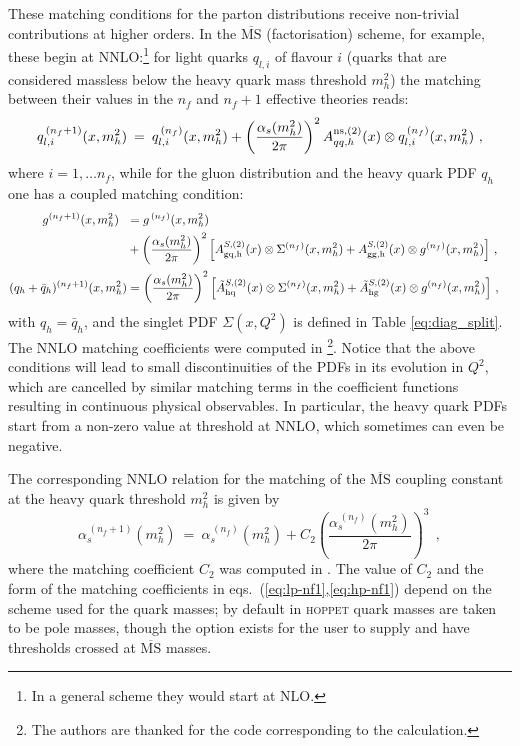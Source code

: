 \documentclass[12pt]{article}
\newcommand{\lp}{\left(}
\newcommand{\rp}{\right)}
\newcommand{\nf}{n_f)}
\newcommand{\nn}{\nonumber}
\newcommand{\as}{\alpha_s}
\newcommand{\MSbar}{\overline{\mathrm{MS}}}
\newcommand{\hoppet}{\textsc{hoppet}\xspace}
\begin{document}
These matching conditions for the parton distributions
receive non-trivial contributions at higher orders. In the $\MSbar$
(factorisation) scheme, for example, these begin at NNLO:\footnote{In
  a general scheme they would start at NLO.} %
for light quarks $q_{l,i}$ of flavour $i$ 
(quarks that are considered massless
below the heavy quark mass threshold $m_h^2$) the matching between
their values in the $n_f$ and
$n_f+1$ effective theories reads:
\begin{equation}
\label{eq:lp-nf1}
  q_{l,i}^{\,(n_f+1)}(x,m_h^2) \: = \:  q_{l,i}^{\,(\nf}(x,m_h^2) +
\lp \frac{\alpha_s(m_h^2)}{2\pi} \rp^2
   A^{\rm ns,(2)}_{qq,h}(x) \otimes
  q_{l,i}^{\, (\nf}(x,m_h^2) \ ,
\end{equation}
where  $i = 1,\ldots n_f$, while for the gluon
distribution and the heavy quark PDF $q_h$ one has a coupled matching 
condition:
\begin{align}
\label{eq:hp-nf1}
  g^{(n_f+1)}(x,m_h^2) \:\:\: &=
    g^{\, (\nf}(x,m_h^2) 
\\ &+ \lp \frac{\alpha_s(m_h^2)}{2\pi} \rp^2 \Big[
    A_{\rm gq,h}^{S,(2)}(x) \otimes \Sigma^{(\nf}(x,m_h^2) +
    A_{\rm gg,h}^{S,(2)}(x) \otimes g^{(\nf}(x,m_h^2) \Big ]\ ,
  \nn \\[0.5mm] 
  (q_h+\bar{q}_{h})^{(n_f+1)}(x,m_h^2)  &=
   \lp \frac{\alpha_s(m_h^2)}{2\pi} \rp^2 \Big [
    \tilde{A}_{\rm hq}^{S,(2)}(x)\otimes \Sigma^{(\nf}(x,m_h^2) 
    + \tilde{A}_{\rm hg}^{S,(2)}(x)\otimes g^{(\nf}(x,m_h^2) \Big  ] \ ,
  \quad \nonumber
\end{align}
with $q_h=\bar{q}_h$, and the singlet PDF $\Sigma(x,Q^2)$ is defined
in Table \ref{eq:diag_split}.
The NNLO matching coefficients were
computed in \cite{NNLO-MTM}\footnote{The authors are thanked 
for the code corresponding to the
calculation.}.
Notice that the above conditions will lead to small discontinuities
of the PDFs in its evolution in $Q^2$, 
which are cancelled by similar matching terms
in the coefficient functions resulting in continuous physical
observables. In particular, the heavy quark PDFs start from a non-zero
value at threshold at NNLO, which sometimes can even be
negative.

The corresponding NNLO relation for the matching of the $\MSbar$
coupling constant at the heavy quark threshold $m^2_h$ is given by 
\begin{equation}
\label{eq:as-nf1}
  \as^{\, (n_f+1)}(m_h^2) \: = \:
  \as^{\, (\nf} (m_h^2) +   C_2 \lp \frac{\as^{\, (\nf} (m_h^2)}{2\pi} \rp^3
   \:\: ,
\end{equation}
where the matching coefficient $C_2$ was computed in \cite{Chetyrkin:1997sg}.
%
The value of $C_2$ and the form of the matching coefficients in
eqs.~(\ref{eq:lp-nf1},\ref{eq:hp-nf1}) depend on the scheme used for
the quark masses; by default in \hoppet quark masses are taken to be
pole masses, though the option exists for the user to supply and have
thresholds crossed at $\MSbar$ masses.
\end{document}

